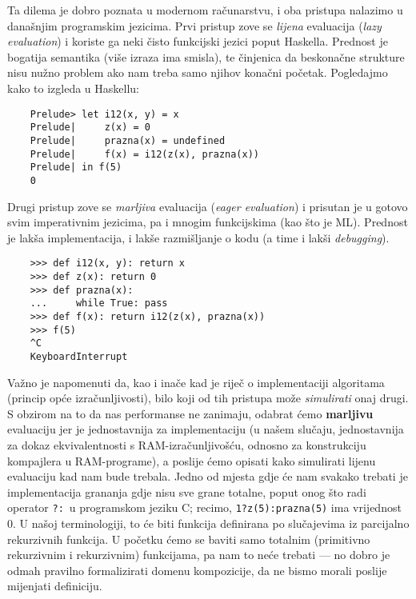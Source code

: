 Ta dilema je dobro poznata u modernom računarstvu, i oba pristupa nalazimo u današnjim programskim jezicima. Prvi pristup zove se \emph{lijena} evaluacija (\emph{lazy evaluation}) i koriste ga neki čisto funkcijski jezici poput Haskella. Prednost je bogatija semantika (više izraza ima smisla), te činjenica da beskonačne strukture nisu nužno problem ako nam treba samo njihov konačni početak. Pogledajmo kako to izgleda u Haskellu:
\begin{verbatim}
    Prelude> let i12(x, y) = x
    Prelude|     z(x) = 0
    Prelude|     prazna(x) = undefined
    Prelude|     f(x) = i12(z(x), prazna(x))
    Prelude| in f(5)
    0
\end{verbatim}
Drugi pristup zove se \emph{marljiva} evaluacija (\emph{eager evaluation}) i prisutan je u gotovo svim imperativnim jezicima, pa i mnogim funkcijskima (kao što je ML). Prednost je lakša implementacija, i lakše razmišljanje o kodu (a time i lakši \emph{debugging}).
\begin{verbatim}
    >>> def i12(x, y): return x
    >>> def z(x): return 0
    >>> def prazna(x):
    ...     while True: pass
    >>> def f(x): return i12(z(x), prazna(x))
    >>> f(5)
    ^C
    KeyboardInterrupt
\end{verbatim}

Važno je napomenuti da, kao i inače kad je riječ o implementaciji algoritama (princip opće izračunljivosti), bilo koji od tih pristupa može \emph{simulirati} onaj drugi. S obzirom na to da nas performanse ne zanimaju, odabrat ćemo \textbf{marljivu} evaluaciju jer je jednostavnija za implementaciju (u našem slučaju, jednostavnija za dokaz ekvivalentnosti s RAM-izračunljivošću, odnosno za konstrukciju kompajlera u RAM-programe), a poslije ćemo opisati kako simulirati lijenu evaluaciju kad nam bude trebala. Jedno od mjesta gdje će nam svakako trebati je implementacija grananja gdje nisu sve grane totalne, poput onog što radi operator \texttt{?:}\ u programskom jeziku C; recimo, \texttt{1?z(5):prazna(5)} ima vrijednost $0$. U našoj terminologiji, to će biti funkcija definirana po slučajevima iz parcijalno rekurzivnih funkcija. U početku ćemo se baviti samo totalnim (primitivno rekurzivnim i rekurzivnim) funkcijama, pa nam to neće trebati --- no dobro je odmah pravilno formalizirati domenu kompozicije, da ne bismo morali poslije mijenjati definiciju.

